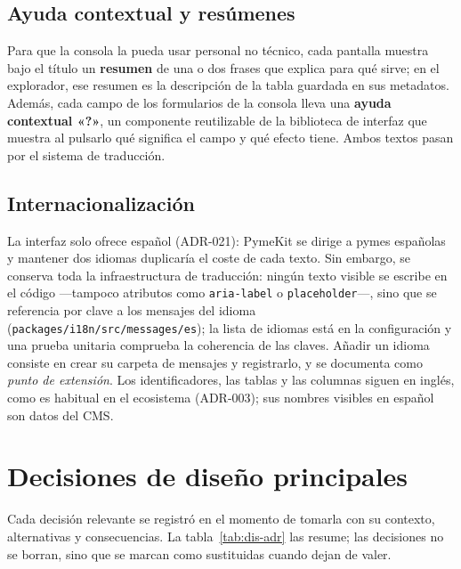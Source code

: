 \subsection{Ayuda contextual y resúmenes}
\label{sec:dis-ayudas}

Para que la consola la pueda usar personal no técnico, cada pantalla muestra
bajo el título un \textbf{resumen} de una o dos frases que explica para qué
sirve; en el explorador, ese resumen es la descripción de la tabla guardada en
sus metadatos. Además, cada campo de los formularios de la consola lleva una
\textbf{ayuda contextual «?»}, un componente reutilizable de la biblioteca de
interfaz que muestra al pulsarlo qué significa el campo y qué efecto tiene.
Ambos textos pasan por el sistema de traducción.

\subsection{Internacionalización}
\label{sec:dis-i18n}

La interfaz solo ofrece español (ADR-021): PymeKit se dirige a pymes
españolas y mantener dos idiomas duplicaría el coste de cada texto. Sin
embargo, se conserva toda la infraestructura de traducción: ningún texto
visible se escribe en el código ---tampoco atributos como \texttt{aria-label}
o \texttt{placeholder}---, sino que se referencia por clave a los mensajes del
idioma (\texttt{packages/i18n/src/messages/es}); la lista de idiomas está en
la configuración y una prueba unitaria comprueba la coherencia de las claves.
Añadir un idioma consiste en crear su carpeta de mensajes y registrarlo,
y se documenta como \emph{punto de extensión}. Los identificadores, las
tablas y las columnas siguen en inglés, como es habitual en el ecosistema
(ADR-003); sus nombres visibles en español son datos del CMS.

\section{Decisiones de diseño principales}
\label{sec:dis-decisiones}

Cada decisión relevante se registró en el momento de tomarla con su contexto,
alternativas y consecuencias. La tabla~\ref{tab:dis-adr} las resume; las
decisiones no se borran, sino que se marcan como sustituidas cuando dejan de
valer.

